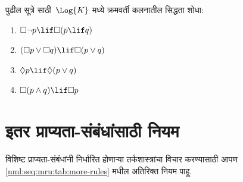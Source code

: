 \begin{prob}
  पुढील सूत्रे साठी~$\Log{K}$ मध्ये
  क्रमवर्ती कलनातील सिद्धता शोधा:
  \begin{enumerate}
    \item $\Box \lnot p \lif \Box(p \lif q)$
    \item $(\Box p \lor \Box q) \lif \Box(p \lor q)$
    \item $\Diamond p \lif \Diamond(p \lor q)$
    \item $\Box(p \land q) \lif \Box p$
  \end{enumerate}
\end{prob}













\section{इतर प्राप्यता-संबंधांसाठी नियम}\label{nml:seq:mru:sec}

विशिष्ट प्राप्यता-संबंधांनी निर्धारित होणाऱ्या
तर्कशास्त्रांचा विचार करण्यासाठी आपण
\ref{nml:seq:mru:tab:more-rules} मधील अतिरिक्त नियम पाहू.


